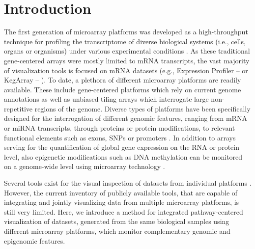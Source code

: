 \documentclass{bioinfo}
\begin{document}
\section{Introduction}

The first generation of microarray platforms was developed as a high-throughput technique for
profiling the transcriptome of diverse biological systems (i.e., cells, organs or organisms) under
various experimental conditions \citep{Schena1995, Golub1999}. As these traditional gene-centered
arrays were mostly limited to mRNA transcripts, the vast majority of visualization tools is focused
on mRNA datasets (e.g., Expression Profiler -- \citealp{Kapushesky2004} or KegArray --
\citealp{KEGG}). To date, a plethora of different microarray platforms are readily available. These
include gene-centered platforms which rely on current genome annotations as well as unbiased tiling
arrays which interrogate large non-repetitive regions of the genome. Diverse types of platforms have
been specifically designed for the interrogation of different genomic features, ranging from mRNA or
miRNA transcripts, through proteins or protein modifications, to relevant functional elements such
as exons, SNPs or promoters \citep{Hoheisel2006}. In addition to arrays serving for the
quantification of global gene expression on the RNA or protein level, also epigenetic modifications
such as DNA methylation can be monitored on a genome-wide level using microarray technology
\citep{Schumacher2006}.

Several tools exist for the visual inspection of datasets from individual platforms \citep[see][for
some examples]{Gehlenborg2010}. However, the current inventory of publicly available tools, that are
capable of integrating and jointly visualizing data from multiple microarray platforms, is still
very limited. Here, we introduce a method for integrated pathway-centered visualization of
datasets, generated from the same biological samples using different microarray platforms, which
monitor complementary genomic and epigenomic features.
\end{document}
